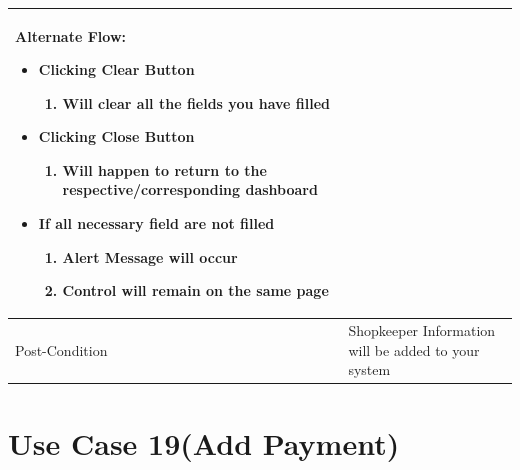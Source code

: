 \documentclass[12pt,a4paper]{report}
\begin{document}
\begin{tabular}{ | m{3cm} | m{12cm}| }
\begin{enumerate}
\end{enumerate}

Alternate Flow:

\begin{itemize}
\item Clicking Clear Button
	\begin{enumerate}
		\item Will clear all the fields you have filled
	\end{enumerate}
\item 	Clicking Close Button
	\begin{enumerate}
	   	 \item	Will happen to return to the respective/corresponding dashboard
	\end{enumerate}
\item If all necessary field are not filled
	\begin{enumerate}
		\item Alert Message will occur
		\item Control will remain on the same page
	\end{enumerate}
\end{itemize}
\\ \hline
Post-Condition &  Shopkeeper Information will be added to your system   \\ \hline

\end{tabular}
\section{Use Case 19(Add Payment) }
\end{document}
